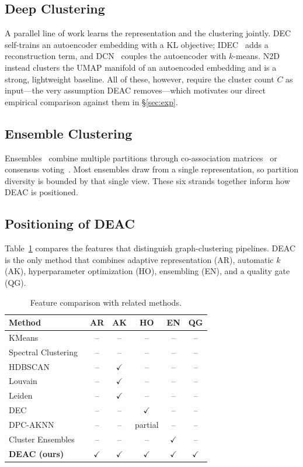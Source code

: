 \documentclass[journal]{IEEEtran}
\begin{document}
\subsection{Deep Clustering}
A parallel line of work learns the representation and the clustering jointly. DEC~\cite{xie2016unsupervised} self-trains an autoencoder embedding with a KL objective; IDEC~\cite{guo2017improved} adds a reconstruction term, and DCN~\cite{yang2017towards} couples the autoencoder with $k$-means. N2D~\cite{mcconville2021n2d} instead clusters the UMAP manifold of an autoencoded embedding and is a strong, lightweight baseline. All of these, however, require the cluster count $C$ as input---the very assumption DEAC removes---which motivates our direct empirical comparison against them in \S\ref{sec:exp}.

\subsection{Ensemble Clustering}
Ensembles~\cite{strehl2002cluster} combine multiple partitions through co-association matrices~\cite{fred2005combining} or consensus voting~\cite{vega2011survey}. Most ensembles draw from a single representation, so partition diversity is bounded by that single view. These six strands together inform how DEAC is positioned.

\subsection{Positioning of DEAC}
Table~\ref{tab:related} compares the features that distinguish graph-clustering pipelines. DEAC is the only method that combines adaptive representation (AR), automatic $k$ (AK), hyperparameter optimization (HO), ensembling (EN), and a quality gate (QG).

\begin{table}[htbp]
\centering
\caption{Feature comparison with related methods.}
\label{tab:related}
\footnotesize
\setlength{\tabcolsep}{3pt}
\begin{tabular}{lccccc}
\toprule
Method & AR & AK & HO & EN & QG \\
\midrule
KMeans~\cite{lloyd1982least} & -- & -- & -- & -- & -- \\
Spectral Clustering~\cite{ng2001spectral} & -- & -- & -- & -- & -- \\
HDBSCAN~\cite{campello2013density} & -- & $\checkmark$ & -- & -- & -- \\
Louvain~\cite{blondel2008fast} & -- & $\checkmark$ & -- & -- & -- \\
Leiden~\cite{traag2019louvain} & -- & $\checkmark$ & -- & -- & -- \\
DEC~\cite{xie2016unsupervised} & -- & -- & $\checkmark$ & -- & -- \\
DPC-AKNN~\cite{wang2026density} & -- & -- & partial & -- & -- \\
Cluster Ensembles~\cite{strehl2002cluster} & -- & -- & -- & $\checkmark$ & -- \\
\textbf{DEAC (ours)} & $\checkmark$ & $\checkmark$ & $\checkmark$ & $\checkmark$ & $\checkmark$ \\
\bottomrule
\end{tabular}
\end{table}
\end{document}
